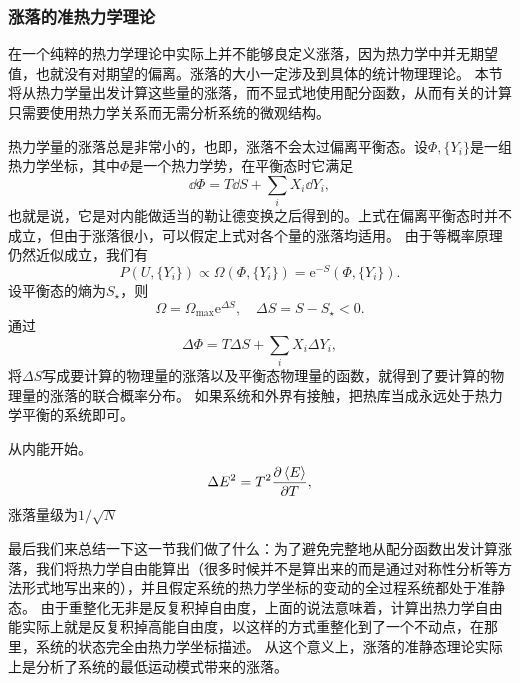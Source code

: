 \documentclass[hyperref, UTF8, a4paper]{ctexart}
\newcommand*{\ee}{\mathrm{e}}
\begin{document}
\subsubsection{涨落的准热力学理论}

在一个纯粹的热力学理论中实际上并不能够良定义涨落，因为热力学中并无期望值，也就没有对期望的偏离。涨落的大小一定涉及到具体的统计物理理论。
本节将从热力学量出发计算这些量的涨落，而不显式地使用配分函数，从而有关的计算只需要使用热力学关系而无需分析系统的微观结构。

热力学量的涨落总是非常小的，也即，涨落不会太过偏离平衡态。设$\Phi, \{Y_i\}$是一组热力学坐标，其中$\Phi$是一个热力学势，在平衡态时它满足
\[
    \dd{\Phi} = T \dd{S} + \sum_i X_i \dd{Y_i}, 
\]
也就是说，它是对内能做适当的勒让德变换之后得到的。上式在偏离平衡态时并不成立，但由于涨落很小，可以假定上式对各个量的涨落均适用。
由于等概率原理仍然近似成立，我们有
\[
    P(U, \{Y_i\}) \propto \Omega(\Phi, \{Y_i\}) = \ee^{-S}(\Phi, \{Y_i\}).
\]
设平衡态的熵为$S_\star$，则
\begin{equation}
    \Omega = \Omega_\text{max} \ee^{\Delta S}, \quad \Delta S = S - S_\star < 0.
\end{equation}
通过
\[
    \Delta{\Phi} = T \Delta{S} + \sum_i X_i \Delta{Y_i},
\]
将$\Delta S$写成要计算的物理量的涨落以及平衡态物理量的函数，就得到了要计算的物理量的涨落的联合概率分布。
如果系统和外界有接触，把热库当成永远处于热力学平衡的系统即可。

从内能开始。
\begin{equation}
    \Delta E^2 = T^2 \pdv{\expval*{E}}{T},
\end{equation}
涨落量级为$1/\sqrt{N}$

最后我们来总结一下这一节我们做了什么：为了避免完整地从配分函数出发计算涨落，我们将热力学自由能算出（很多时候并不是算出来的而是通过对称性分析等方法形式地写出来的），并且假定系统的热力学坐标的变动的全过程系统都处于准静态。
由于重整化无非是反复积掉自由度，上面的说法意味着，计算出热力学自由能实际上就是反复积掉高能自由度，以这样的方式重整化到了一个不动点，在那里，系统的状态完全由热力学坐标描述。
从这个意义上，涨落的准静态理论实际上是分析了系统的最低运动模式带来的涨落。
\end{document}
